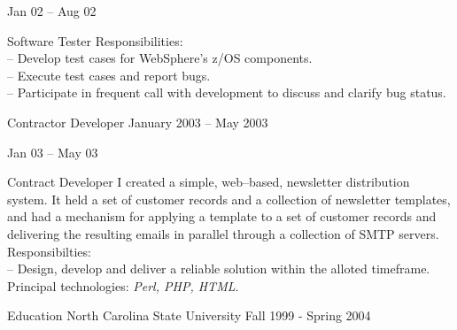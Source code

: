\documentclass[letterpaper, 11pt]{article}
\begin{document}
\begin{resume}
        \begin{subcategory}{Jan 02 -- Aug 02}
            \begin{block}
                 {Software Tester}
                Responsibilities: \\
                -- Develop test cases for WebSphere's z/OS components. \\
                -- Execute test cases and report bugs. \\
                -- Participate in frequent call with development to discuss and clarify bug status.
                \bigskip
            \end{block}
        \end{subcategory}
        \begin{category}{}
             {Contractor Developer}
                     {}               {January 2003 -- May 2003}
        \end{category}
        \begin{subcategory}{Jan 03 -- May 03}
            \begin{block}
                 {Contract Developer}
                I created a simple, web--based, newsletter distribution system.
                It held a set of customer records and a collection of newsletter templates,
                and had a mechanism for applying a template to a set of customer records and
                delivering the resulting emails in parallel through a collection of SMTP servers.
                \\[1ex]
                Responsibilties: \\
                -- Design, develop and deliver a reliable solution within the alloted timeframe.
                \\[1ex]
                Principal technologies: \emph{Perl, PHP, HTML}.
                \bigskip
            \end{block}
        \end{subcategory}
        \begin{category}{Education}
             {North Carolina State University}
                     { }                        {Fall 1999 - Spring 2004}
        \end{category}
    \end{resume}
\end{document}
